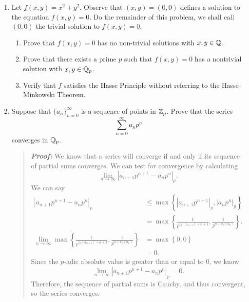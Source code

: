 \documentclass{hw}
\begin{document}
\begin{enumerate}
	\item Let $f(x,y)=x^2 + y^2$. Observe that $(x,y)=(0,0)$ defines a solution to the equation $f(x,y)=0$. Do the remainder of this problem, we shall call $(0,0)$ the trivial solution to $f(x,y)=0$.
	      \begin{enumerate}
	      	\item Prove that $f(x,y)=0$ has no non-trivial solutions with $x,y\in\mathbb{Q}$.
	      	\item Prove that there exists a prime $p$ such that $f(x,y)=0$ has a nontrivial solution with $x,y\in\mathbb{Q}_{p}$.
	      	\item Verify that $f$ satisfies the Hasse Principle without referring to the Hasse-Minkowski Theorem.
	      \end{enumerate}

	\item Suppose that $\{ a_{n} \}_{n=0}^{\infty}$ is a sequence of points in $\mathbb{Z}_{p}$. Prove that the series
	      \[
	      	\sum_{n=0}^{\infty}a_{n}p^{n}
	      \]
	      converges in $\mathbb{Q}_{p}$.
	      \begin{quote}
	      	\textit{\textbf{Proof:}} We know that a series will converge if and only if its sequence of partial sums converges. We can test for convergence by calculating
	      	\[
	      		\lim_{n\to\infty}\left|a_{n+1}p^{n+1}-a_{n}p^{n}\right|_{p}.
	      	\]
	      	We can say
	      	\begin{align*}
	      		\left|a_{n+1}p^{n+1}-a_{n}p^{n}\right|_{p} &\leq \max\left\{%
	      		\left|a_{n+1}p^{n+1}\right|_{p},\left|a_{n}p^{n}\right|_{p}%
	      		\right\}\\
	      		                                           &= \max\left\{%
	      		\frac{1}{p^{v_{p}(a_{n+1}) + n + 1}}, \frac{1}{p^{n+v_{p}(a_{n})}}%
	      		\right\}.\\
	      		\lim_{n\to\infty}\max\left\{%
	      		\frac{1}{p^{v_{p}(a_{n+1}) + n + 1}}, \frac{1}{p^{n+v_{p}(a_{n})}}%
	      		\right\}                                   & = \max\left\{0,0\right\} \\
	      		                                           & = 0.
	      	\end{align*}
			Since the $p$-adic absolute value is greater than or equal to 0, we know
			\[
			\lim_{n\to\infty}\left|a_{n+1}p^{n+1}-a_{n}p^{n}\right|_{p} = 0.
			\]
	      	Therefore, the sequence of partial sums is Cauchy, and thus convergent, so the series converges.
	      \end{quote}


\end{enumerate}
\end{document}
